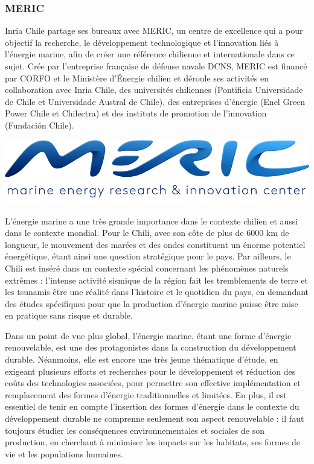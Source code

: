 \subsubsection{MERIC}

\indent Inria Chile partage ses bureaux avec MERIC, un centre de excellence qui a pour objectif la recherche, le développement technologique et l'innovation liés à l'énergie marine, afin de créer une référence chilienne et internationale dans ce sujet. Crée par l'entreprise française de défense navale DCNS, MERIC est financé par CORFO et le Ministère d'Énergie chilien et déroule ses activités en collaboration avec Inria Chile, des universités chiliennes (Pontificia Universidade de Chile et Universidade Austral de Chile), des entreprises d'énergie (Enel Green Power Chile et Chilectra) et des instituts de promotion de l'innovation (Fundación Chile).  

\begingroup
\centering
\includegraphics[scale=.3]{figures/logos/meric.png}
\endgroup

\indent L'énergie marine a une très grande importance dans le contexte chilien et aussi dans le contexte mondial. Pour le Chili, avec son côte de plus de 6000 km de longueur, le mouvement des marées et des ondes constituent un énorme potentiel énergétique, étant ainsi une question stratégique pour le pays. Par ailleurs, le Chili est inséré dans un contexte spécial concernant les phénomènes naturels extrêmes : l'intense activité sismique de la région fait les tremblements de terre et les tsunamis être une réalité dans l'histoire et le quotidien du pays, en demandant des études spécifiques pour que la production d'énergie marine puisse être mise en pratique sans risque et durable.

\indent Dans un point de vue plus global, l'énergie marine, étant une forme d'énergie renouvelable, est une des protagonistes dans la construction du développement durable. Néanmoins, elle est encore une très jeune thématique d'étude, en exigeant plusieurs efforts et recherches pour le développement et réduction des coûts des technologies associées, pour permettre son effective implémentation et remplacement des formes d'énergie traditionnelles et limitées. En plus, il est essentiel de tenir en compte l'insertion des formes d'énergie dans le contexte du développement durable ne comprenne seulement son aspect renouvelable : il faut toujours étudier les conséquences environnementales et sociales de son production, en cherchant à minimiser les impacts sur les habitats, ses formes de vie et les populations humaines.

